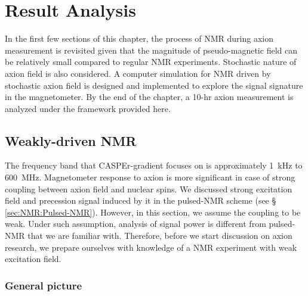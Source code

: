 \chapter{Result Analysis}

In the first few sections of this chapter, the process of NMR during axion measurement is revisited given that the magnitude of pseudo-magnetic field can be relatively small compared to regular NMR experiments. Stochastic nature of axion field is also considered. A computer simulation for NMR driven by stochastic axion field is designed and implemented to explore the signal signature in the magnetometer. By the end of the chapter, a 10-hr axion measurement is analyzed under the framework provided here. 

\section{Weakly-driven NMR}

The frequency band that CASPEr-gradient focuses on is approximately \SI{1}{\kHz} to \SI{600}{\MHz}. 
Magnetometer response to axion is more significant in case of strong coupling between axion field and nuclear spins. We discussed strong excitation field and precession signal induced by it in the pulsed-NMR scheme (see \S\,\ref{sec:NMR:Pulsed-NMR}). 
However, in this section, we assume the coupling to be weak. Under such assumption, analysis of signal power is different from pulsed-NMR that we are familiar with. Therefore, before we start discussion on axion research, we prepare ourselves with knowledge of a NMR experiment with weak excitation field.

\subsection{General picture}


